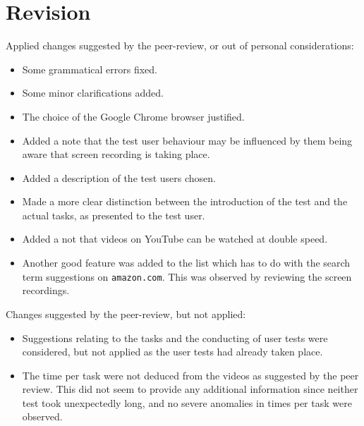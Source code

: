 
\section{Revision}

Applied changes suggested by the peer-review, or out of personal
considerations:

\begin{itemize}

\item Some grammatical errors fixed.

\item Some minor clarifications added.

\item The choice of the Google Chrome browser justified.

\item Added a note that the test user behaviour may be influenced by them being
aware that screen recording is taking place.

\item Added a description of the test users chosen.

\item Made a more clear distinction between the introduction of the test and
the actual tasks, as presented to the test user.

\item Added a not that videos on YouTube can be watched at double speed.

\item Another good feature was added to the list which has to do with the
search term suggestions on \texttt{amazon.com}. This was observed by reviewing
the screen recordings.

\end{itemize}

Changes suggested by the peer-review, but not applied:

\begin{itemize}

\item Suggestions relating to the tasks and the conducting of user tests were
considered, but not applied as the user tests had already taken place.

\item The time per task were not deduced from the videos as suggested by the
peer review. This did not seem to provide any additional information since
neither test took unexpectedly long, and no severe anomalies in times per task
were observed.

\end{itemize}

